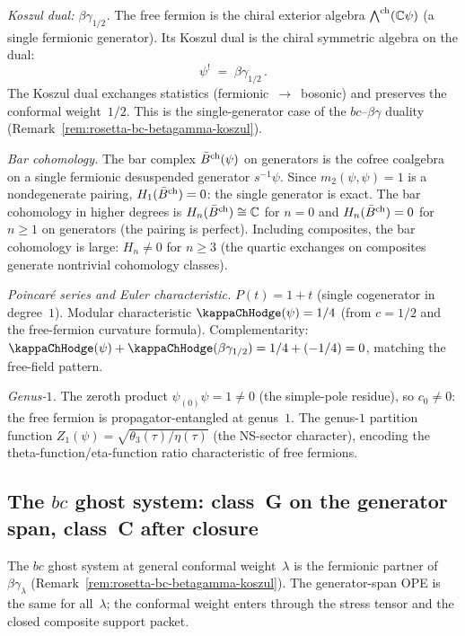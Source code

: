 \begin{computation}
\smallskip
\noindent
\emph{Koszul dual: $\beta\gamma_{1/2}$.}
The free fermion is the chiral exterior algebra
$\bigwedge^{\mathrm{ch}}(\mathbb{C}\psi)$ (a single fermionic
generator). Its Koszul dual is the chiral symmetric
algebra on the dual:
\begin{equation}\label{eq:free-fermion-koszul}
\psi^! \;=\; \beta\gamma_{1/2}\,.
\end{equation}
The Koszul dual exchanges statistics
(fermionic~$\to$~bosonic) and preserves the
conformal weight~$1/2$. This is the single-generator
case of the $bc$--$\beta\gamma$ duality
(Remark~\ref{rem:rosetta-bc-betagamma-koszul}).

\smallskip
\noindent
\emph{Bar cohomology.}
The bar complex $\bar{B}^{\mathrm{ch}}(\psi)$ on generators is the
cofree coalgebra on a single fermionic desuspended generator
$s^{-1}\psi$. Since $m_2(\psi,\psi) = 1$ is a nondegenerate
pairing, $H_1(\bar{B}^{\mathrm{ch}}) = 0$: the single generator is
exact. The bar cohomology in higher degrees is
$H_n(\bar{B}^{\mathrm{ch}}) \cong \mathbb{C}$ for $n = 0$ and
$H_n(\bar{B}^{\mathrm{ch}}) = 0$ for $n \ge 1$ on generators
(the pairing is perfect). Including composites, the
bar cohomology is large: $H_n \ne 0$ for $n \ge 3$
(the quartic exchanges on composites generate
nontrivial cohomology classes).

\smallskip
\noindent
\emph{Poincar\'{e} series and Euler characteristic.}
$P(t) = 1 + t$ (single cogenerator in degree~$1$).
Modular characteristic $\kappaChHodge(\psi) = 1/4$
(from $c = 1/2$ and the free-fermion curvature formula).
Complementarity: $\kappaChHodge(\psi) + \kappaChHodge(\beta\gamma_{1/2})
= 1/4 + (-1/4) = 0$, matching the free-field pattern.

\smallskip
\noindent
\emph{Genus-$1$.}
The zeroth product $\psi_{(0)}\psi = 1 \ne 0$
(the simple-pole residue), so $c_0 \ne 0$: the free fermion is
propagator-entangled at genus~$1$. The genus-$1$ partition function
$Z_1(\psi) = \sqrt{\theta_3(\tau)/\eta(\tau)}$
(the NS-sector character), encoding the
theta-function/eta-function ratio characteristic of
free fermions.
\end{computation}

\subsection{The $bc$ ghost system: class~G on the generator span, class~C after closure}%
\label{subsec:bc-ordered-bar}%
%

The $bc$ ghost system at general conformal weight~$\lambda$
is the fermionic partner of $\beta\gamma_\lambda$
(Remark~\ref{rem:rosetta-bc-betagamma-koszul}). The generator-span OPE
is the same for all~$\lambda$; the conformal weight enters through the
stress tensor and the closed composite support packet.

